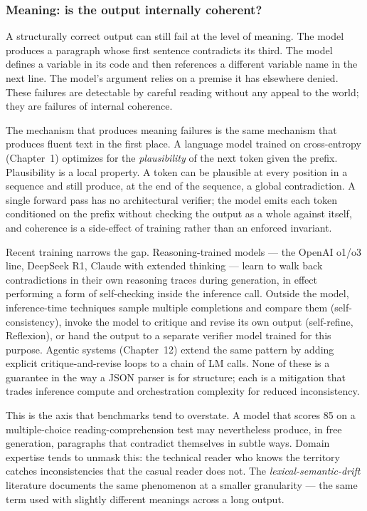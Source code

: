 \subsubsection{Meaning: is the output internally coherent?}

A structurally correct output can still fail at the level of
meaning. The model produces a paragraph whose first sentence
contradicts its third. The model defines a variable in its code
and then references a different variable name in the next line.
The model's argument relies on a premise it has elsewhere denied.
These failures are detectable by careful reading without any
appeal to the world; they are failures of internal coherence.

The mechanism that produces meaning failures is the same mechanism
that produces fluent text in the first place. A language model
trained on cross-entropy (Chapter~1) optimizes for the
\emph{plausibility} of the next token given the prefix.
Plausibility is a local property. A token can be plausible at
every position in a sequence and still produce, at the end of the
sequence, a global contradiction. A single forward pass has no
architectural verifier; the model emits each token conditioned on
the prefix without checking the output as a whole against itself,
and coherence is a side-effect of training rather than an enforced
invariant.

Recent training narrows the gap. Reasoning-trained models --- the
OpenAI o1/o3 line, DeepSeek R1, Claude with extended thinking ---
learn to walk back contradictions in their own reasoning traces
during generation, in effect performing a form of self-checking
inside the inference call. Outside the model, inference-time
techniques sample multiple completions and compare them
(self-consistency), invoke the model to critique and revise its
own output (self-refine, Reflexion), or hand the output to a
separate verifier model trained for this purpose. Agentic systems
(Chapter~12) extend the same pattern by adding explicit
critique-and-revise loops to a chain of LM calls. None of these is
a guarantee in the way a JSON parser is for structure; each is a
mitigation that trades inference compute and orchestration
complexity for reduced inconsistency.

This is the axis that benchmarks tend to overstate. A model that
scores 85 on a multiple-choice reading-comprehension test may
nevertheless produce, in free generation, paragraphs that
contradict themselves in subtle ways. Domain expertise tends to
unmask this: the technical reader who knows the territory catches
inconsistencies that the casual reader does not. The
\emph{lexical-semantic-drift} literature documents the same
phenomenon at a smaller granularity --- the same term used with
slightly different meanings across a long output.


